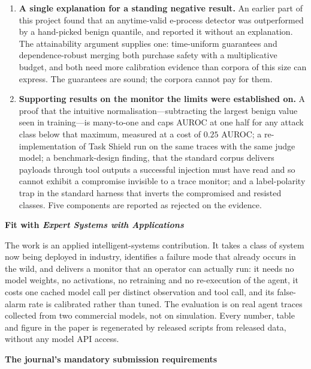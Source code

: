 \documentclass[10pt]{article}
\begin{document}
\begin{enumerate}[leftmargin=1.4em,itemsep=0.3em]
\item \textbf{A single explanation for a standing negative result.} An earlier
part of this project found that an anytime-valid e-process detector was
outperformed by a hand-picked benign quantile, and reported it without an
explanation. The attainability argument supplies one: time-uniform guarantees and
dependence-robust merging both purchase safety with a multiplicative budget, and
both need more calibration evidence than corpora of this size can express. The
guarantees are sound; the corpora cannot pay for them.

\item \textbf{Supporting results on the monitor the limits were established on.}
A proof that the intuitive normalisation---subtracting the largest benign value
seen in training---is many-to-one and caps AUROC at one half for any attack class
below that maximum, measured at a cost of $0.25$ AUROC; a re-implementation of Task
Shield run on the same traces with the same judge model; a benchmark-design
finding, that the standard corpus delivers payloads through tool outputs a
successful injection must have read and so cannot exhibit a compromise invisible to
a trace monitor; and a label-polarity trap in the standard harness that inverts the
compromised and resisted classes. Five components are reported as rejected on the
evidence.
\end{enumerate}

\noindent\textbf{Fit with \emph{Expert Systems with Applications}}

\vspace{0.3em}
The work is an applied intelligent-systems contribution. It takes a class of
system now being deployed in industry, identifies a failure mode that already
occurs in the wild, and delivers a monitor that an operator can actually run: it
needs no model weights, no activations, no retraining and no re-execution of the
agent, it costs one cached model call per distinct observation and tool call, and
its false-alarm rate is calibrated rather than tuned. The evaluation is on real
agent traces collected from two commercial models, not on simulation. Every
number, table and figure in the paper is regenerated by released scripts from
released data, without any model API access.

\vspace{0.4em}
\noindent\textbf{The journal's mandatory submission requirements}
\end{document}
